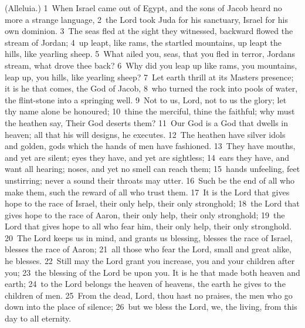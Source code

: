 \documentclass[10pt]{book} %
\begin{document}
(Alleluia.)
\textcolor{benred8}{1}~When Israel came out of Egypt, and the sons of Jacob heard no more a strange language, \textcolor{benred8}{2}~the Lord took Juda for his sanctuary, Israel for his own dominion. \textcolor{benred8}{3}~The seas fled at the sight they witnessed, backward flowed the stream of Jordan; \textcolor{benred8}{4}~up leapt, like rams, the startled mountains, up leapt the hills, like yearling sheep. \textcolor{benred8}{5}~What ailed you, seas, that you fled in terror, Jordan\textquotesingle s stream, what drove thee back? \textcolor{benred8}{6}~Why did you leap up like rams, you mountains, leap up, you hills, like yearling sheep? \textcolor{benred8}{7}~Let earth thrill at its Master\textquotesingle s presence; it is he that comes, the God of Jacob, \textcolor{benred8}{8}~who turned the rock into pools of water, the flint-stone into a springing well.
\textcolor{benred8}{9}~Not to us, Lord, not to us the glory; let thy name alone be honoured; \textcolor{benred8}{10}~thine the merciful, thine the faithful; why must the heathen say, Their God deserts them? \textcolor{benred8}{11}~Our God is a God that dwells in heaven; all that his will designs, he executes. \textcolor{benred8}{12}~The heathen have silver idols and golden, gods which the hands of men have fashioned. \textcolor{benred8}{13}~They have mouths, and yet are silent; eyes they have, and yet are sightless; \textcolor{benred8}{14}~ears they have, and want all hearing; noses, and yet no smell can reach them; \textcolor{benred8}{15}~hands unfeeling, feet unstirring; never a sound their throats may utter. \textcolor{benred8}{16}~Such be the end of all who make them, such the reward of all who trust them. \textcolor{benred8}{17}~It is the Lord that gives hope to the race of Israel, their only help, their only stronghold; \textcolor{benred8}{18}~the Lord that gives hope to the race of Aaron, their only help, their only stronghold; \textcolor{benred8}{19}~the Lord that gives hope to all who fear him, their only help, their only stronghold. \textcolor{benred8}{20}~The Lord keeps us in mind, and grants us blessing, blesses the race of Israel, blesses the race of Aaron; \textcolor{benred8}{21}~all those who fear the Lord, small and great alike, he blesses. \textcolor{benred8}{22}~Still may the Lord grant you increase, you and your children after you; \textcolor{benred8}{23}~the blessing of the Lord be upon you. It is he that made both heaven and earth; \textcolor{benred8}{24}~to the Lord belongs the heaven of heavens, the earth he gives to the children of men. \textcolor{benred8}{25}~From the dead, Lord, thou hast no praises, the men who go down into the place of silence; \textcolor{benred8}{26}~but we bless the Lord, we, the living, from this day to all eternity.
\end{document}
